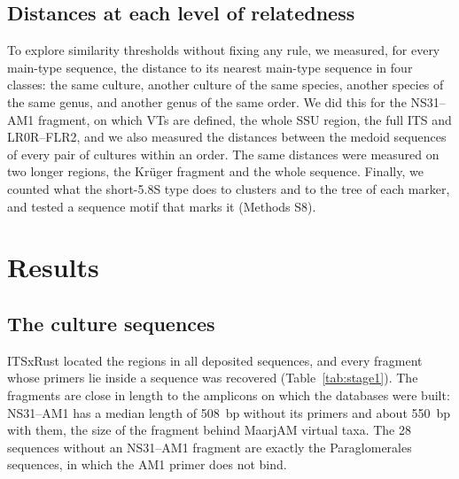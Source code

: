 \documentclass[11pt]{article}
\begin{document}
\subsection{Distances at each level of relatedness}\label{sec:distmethods}
To explore similarity thresholds without fixing any rule, we measured, for every main-type sequence, the distance to
its nearest main-type sequence in four classes: the same culture, another culture of the same species, another
species of the same genus, and another genus of the same order. We did this for the NS31--AM1 fragment, on which VTs
are defined, the whole SSU region, the full ITS and LR0R--FLR2, and we also measured the distances between the medoid
sequences of every pair of cultures within an order. The same distances were measured on two longer regions, the
Kr\"uger fragment and the whole sequence. Finally, we counted what the short-5.8S type does to clusters and to the
tree of each marker, and tested a sequence motif that marks it (Methods S8).

\section{Results}
\subsection{The culture sequences}\label{sec:copies}
ITSxRust located the regions in all \NCopiesIn{} deposited sequences, and every fragment whose primers lie inside a
sequence was recovered (Table~\ref{tab:stage1}). The fragments are close in length to the amplicons on which the
databases were built: NS31--AM1 has a median length of 508~bp without its primers and about 550~bp with them, the
size of the fragment behind MaarjAM virtual taxa. The 28 sequences without an NS31--AM1 fragment are exactly the
Paraglomerales sequences, in which the AM1 primer does not bind.
\end{document}
